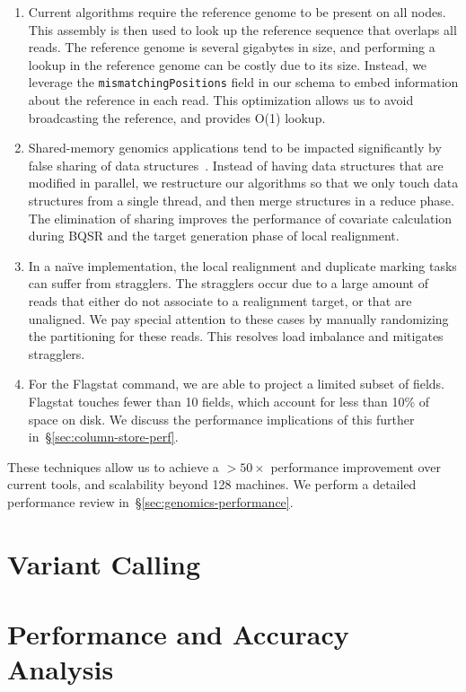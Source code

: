 \documentclass[10pt]{report} %
\begin{document}
\begin{enumerate}
\item Current algorithms require the reference genome to be present on all nodes. This assembly is then used to
look up the reference sequence that overlaps all reads. The reference genome is several gigabytes in
size, and performing a lookup in the reference genome can be costly due to its size. Instead, we leverage
the \texttt{mismatchingPositions} field in our schema to embed information about the reference in each read. This
optimization allows us to avoid broadcasting the reference, and provides O(1) lookup.
\item Shared-memory genomics applications tend to be impacted significantly by false sharing of data
structures~\cite{zaharia11}. Instead of having data structures that are modified in parallel, we
restructure our algorithms so that we only touch data structures from a single thread, and then merge
structures in a reduce phase. The elimination of sharing improves the performance of covariate calculation during
BQSR and the target generation phase of local realignment.
\item In a na\"{i}ve implementation, the local realignment and duplicate marking tasks can suffer from
stragglers. The stragglers occur due to a large amount of reads that either do not associate to a realignment
target, or that are unaligned. We pay special attention to these cases by manually randomizing the
partitioning for these reads. This resolves load imbalance and mitigates stragglers.
\item For the Flagstat command, we are able to project a limited subset of fields. Flagstat touches fewer
than 10 fields, which account for less than 10\% of space on disk. We discuss the performance
implications of this further in~\S\ref{sec:column-store-perf}.
\end{enumerate}

These techniques allow us to achieve a $>50\times$ performance improvement over current tools, and
scalability beyond 128 machines. We perform a detailed performance review
in~\S\ref{sec:genomics-performance}.

\chapter{Variant Calling}

\chapter{Performance and Accuracy Analysis}
\end{document}
